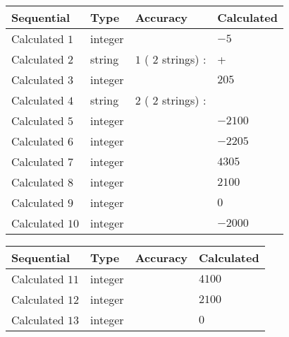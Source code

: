 \documentclass[12pt]{article}
\begin{document}
  
\noindent\begin{tabular}{|l|l|l|l|}
\hline
 Sequential & Type & Accuracy & Calculated \\ 
\hline
 
 
  Calculated $           1$ & integer &  & 
  $ -5 $ 
 \\  \hline  
 
 
  Calculated $           2$ & string & $           1 $ ( $          2 $ strings)
 : 
 & +
 \\  \hline  
 
 
  Calculated $           3$ & integer &  & 
  $ 205 $ 
 \\  \hline  
 
 
  Calculated $           4$ & string & $           2 $ ( $          2 $ strings)
 : 
 & 
 \\  \hline  
 
 
  Calculated $           5$ & integer &  & 
  $ -2100 $ 
 \\  \hline  
 
 
  Calculated $           6$ & integer &  & 
  $ -2205 $ 
 \\  \hline  
 
 
  Calculated $           7$ & integer &  & 
  $ 4305 $ 
 \\  \hline  
 
 
  Calculated $           8$ & integer &  & 
  $ 2100 $ 
 \\  \hline  
 
 
  Calculated $           9$ & integer &  & 
  $ 0 $ 
 \\  \hline  
 
 
  Calculated $          10$ & integer &  & 
  $ -2000 $ 
 \\  \hline  
 \end{tabular}
   
   
  
  
\noindent\begin{tabular}{|l|l|l|l|}
\hline
 Sequential & Type & Accuracy & Calculated \\ 
\hline
 
 
  Calculated $          11$ & integer &  & 
  $ 4100 $ 
 \\  \hline  
 
 
  Calculated $          12$ & integer &  & 
  $ 2100 $ 
 \\  \hline  
 
 
  Calculated $          13$ & integer &  & 
  $ 0 $ 
 \\  \hline  
 \end{tabular}
   
\end{document}
